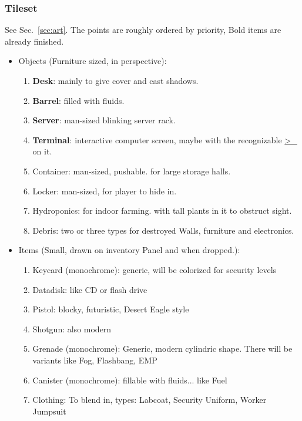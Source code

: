 \documentclass[11pt,a4paper, twocolumn]{article}
\begin{document}
\subsubsection*{Tileset} See Sec.~\ref{sec:art}. The points are roughly ordered by priority,
Bold items are already finished.
        \begin{itemize}
            \item Objects (Furniture sized, in perspective):
                \begin{enumerate}
                    \item \textbf{Desk}: mainly to give cover and cast shadows.
                    \item \textbf{Barrel}: filled with fluids.
                    \item \textbf{Server}: man-sized blinking server rack.
                    \item \textbf{Terminal}: interactive computer screen, maybe with the recognizable \url{ >_ } on it.
                    \item Container: man-sized, pushable. for large storage halls.
                    \item Locker: man-sized, for player to hide in.
                    \item Hydroponics: for indoor farming. with tall plants in it to obstruct sight.
                    \item Debris: two or three types for destroyed Walls, furniture and electronics.
                \end{enumerate}
            \item Items (Small, drawn on inventory Panel and when dropped.):
                \begin{enumerate}
                    \item Keycard (monochrome): generic, will be colorized for security levels
                    \item Datadisk: like CD or flash drive
                    \item Pistol: blocky, futuristic, Desert Eagle style
                    \item Shotgun: also modern
                    \item Grenade (monochrome): Generic, modern cylindric shape. There will be variants like Fog, Flashbang, EMP
                    \item Canister (monochrome): fillable with fluids... like Fuel
                    \item Clothing: To blend in, types: Labcoat, Security Uniform, Worker Jumpsuit

\end{enumerate}
\end{itemize}
\end{document}
